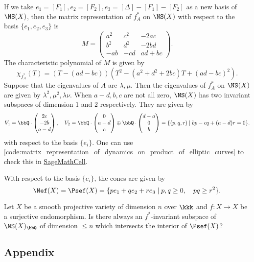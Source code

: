 \begin{example}
        If we take \(e_1= [F_1],e_2=[F_2],e_3=[\Delta]-[F_1]-[F_2]\) as a new basis of \(\NS(X)\), then the matrix representation of \(f_A^*\) on \(\NS(X)\) with respect to the basis \(\{e_1,e_2,e_3\}\) is
        \[
            M = \begin{pmatrix}
                a^2 & c^2 & -2ac \\
                b^2 & d^2 & -2bd \\
                -ab & -cd & ad+bc
            \end{pmatrix}.
        \]
        The characteristic polynomial of \(M\) is given by
        \[ \chi_{f_A^*}(T) = (T - (ad-bc))(T^2 - (a^2+d^2+2bc)T + (ad-bc)^2). \]
        Suppose that the eigenvalues of \(A\) are \(\lambda, \mu\).
        Then the eigenvalues of \(f_A^*\) on \(\NS(X)\) are given by \(\lambda^2, \mu^2, \lambda \nu\).
        When \(a-d,b,c\) are not all zero, \(\NS(X)\) has two invariant subspaces of dimension \(1\) and \(2\) respectively.
        They are given by 
        \[ V_1 = \bbQ \cdot \begin{pmatrix}
            2c \\
            -2b \\
            a-d
        \end{pmatrix}, \quad V_2 = \bbQ \cdot \begin{pmatrix}
            0 \\
            a-d \\
            c
        \end{pmatrix} \oplus \bbQ \cdot \begin{pmatrix}
            d-a \\
            0 \\
            b
        \end{pmatrix} = \{(p,q,r) \mid bp-cq+(a-d)r=0\}. \]
        with respect to the basis \(\{e_i\}\).
        One can use \cref{code:matrix_representation_of_dynamics_on_product_of_elliptic_curves} to check this in \href{https://sagecell.sagemath.org/}{SageMathCell}.

        With respect to the basis \(\{e_i\}\), the cones are given by
        \[ \Nef(X) = \Psef(X) = \{p e_1 + q e_2 + r e_3 \mid p,q \geq 0, \quad pq \geq r^2\}. \]

        \begin{question}
            Let \(X\) be a smooth projective variety of dimension \(n\) over \(\kkk\) and \(f: X \to X\) be a surjective endomorphism.
            Is there always an \(f^*\)-invariant subspace of \(\NS(X)_\bbQ\) of dimension \(\leq n\) which intersects the interior of \(\Psef(X)\)?
        \end{question}
    \end{example}
    

    \subsection{Appendix}
        
        

